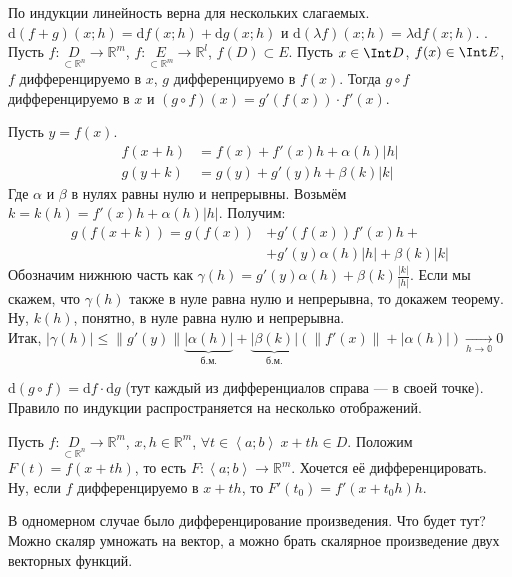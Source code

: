 \documentclass{article}
\newcommand*{\ab}[1][a;b]{{\left\langle #1\right\rangle}}
\begin{document}
\begin{itemize}
\begin{Proof}
        \end{Proof}
        \thm По индукции линейность верна для нескольких слагаемых.
        \thm $\mathrm d(f+g)(x;h)=\mathrm df(x;h)+\mathrm dg(x;h)$ и $\mathrm d(\lambda f)(x;h)=\lambda \mathrm df(x;h)$.
        \thm {}. Пусть $f\colon\underset{\subset \mathbb R^n}D\to\mathbb R^m$, $f\colon\underset{\subset \mathbb R^m}E\to\mathbb R^l$, $f(D)\subset E$. Пусть $x\in\Int D$, $f(x)\in\Int E$, $f$ дифференцируемо в $x$, $g$ дифференцируемо в $f(x)$. Тогда $g\circ f$ дифференцируемо в $x$ и $(g\circ f)(x)=g'(f(x))\cdot f'(x)$.
        \begin{Proof}
            Пусть $y=f(x)$.
            \[\begin{aligned}
                f(x+h)&=f(x)+f'(x)h+\alpha(h)|h|\\
                g(y+k)&=g(y)+g'(y)h+\beta(k)|k|
            \end{aligned}\]
            Где $\alpha$ и $\beta$ в нулях равны нулю и непрерывны.
            Возьмём $k=k(h)=f'(x)h+\alpha(h)|h|$. Получим:
            \[
            \begin{split}
                g(f(x+k))=g(f(x))&+g'(f(x))f'(x)h+\\
                &+g'(y)\alpha(h)|h|+\beta(k)|k|
            \end{split}
            \]
            Обозначим нижнюю часть как $\gamma(h)=g'(y)\alpha(h)+\beta(k)\frac{|k|}{|h|}$. Если мы скажем, что $\gamma(h)$ также в нуле равна нулю и непрерывна, то докажем теорему. Ну, $k(h)$, понятно, в нуле равна нулю и непрерывна.\\
            Итак, $|\gamma(h)|\leqslant\|g'(y)\|\underbrace{|\alpha(h)|}_{\text{б.м.}}+\underbrace{|\beta(k)|}_{\text{б.м.}}(\|f'(x)\|+|\alpha(h)|)\underset{h\to\mathbb0}\longrightarrow0$
        \end{Proof}
        \thm $\mathrm d(g\circ f)=\mathrm df\cdot\mathrm dg$ (тут каждый из дифференциалов справа --- в своей точке).
        \thm Правило по индукции распространяется на несколько отображений.
        \begin{Example}
            Пусть $f\colon\underset{\subset\mathbb R^n}D\to\mathbb R^m$, $x,h\in\mathbb R^m$, $\forall t\in\ab~x+th\in D$. Положим $F(t)=f(x+th)$, то есть $F\colon\ab\to\mathbb R^m$. Хочется её дифференцировать. Ну, если $f$ дифференцируемо в $x+th$, то $F'(t_0)=f'(x+t_0h)h$.
        \end{Example}
        \begin{Comment}
            В одномерном случае было дифференцирование произведения. Что будет тут? Можно скаляр умножать на вектор, а можно брать скалярное произведение двух векторных функций.

\end{Comment}
\end{itemize}
\end{document}
